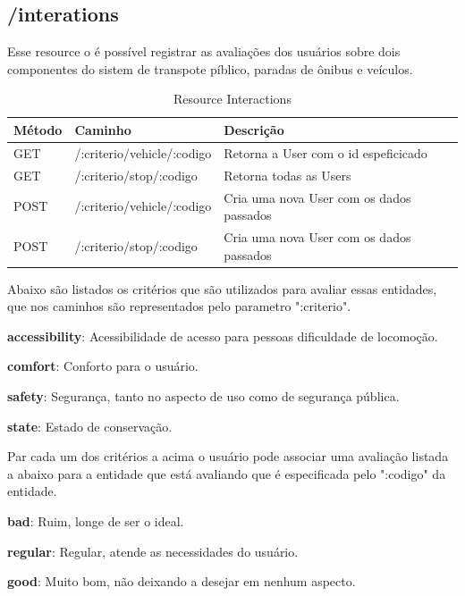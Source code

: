 \subsection{/interations}

Esse resource o é possível registrar as avaliações dos usuários sobre dois componentes do sistem de transpote píblico, 
paradas de ônibus e veículos. 

\begin{table}[htbp]
	\scriptsize
	\centering
	\begin{tabular}{|l|l|l|}
		\hline \textbf{Método} & \textbf{Caminho} & \textbf{Descrição} \\ 
    \hline GET    & /:criterio/vehicle/:codigo  & Retorna a User com o id espeficicado \\
		\hline GET    & /:criterio/stop/:codigo     & Retorna todas as Users \\
    \hline POST   & /:criterio/vehicle/:codigo  & Cria uma nova User com os dados passados \\
    \hline POST   & /:criterio/stop/:codigo     & Cria uma nova User com os dados passados \\
		\hline 
	\end{tabular}
	\caption{Resource Interactions}
	\label{tab:resources}
\end{table}

Abaixo são listados os critérios que são utilizados para avaliar essas entidades, que nos 
caminhos são representados pelo parametro ":criterio".

\begin{lista}
  \item \textbf{accessibility}: Acessibilidade de acesso para pessoas dificuldade de locomoção.
  \item \textbf{comfort}: Conforto para o usuário.
  \item \textbf{safety}: Segurança, tanto no aspecto de uso como de segurança pública.
  \item \textbf{state}: Estado de conservação.
\end{lista}

Par cada um dos critérios a acima o usuário pode associar uma avaliação listada a abaixo para a entidade 
que está avaliando que é especificada pelo ":codigo" da entidade. 

\begin{lista}
  \item \textbf{bad}: Ruim, longe de ser o ideal. 
  \item \textbf{regular}: Regular, atende as necessidades do usuário.
  \item \textbf{good}: Muito bom, não deixando a desejar em nenhum aspecto.
\end{lista}

\clearpage



